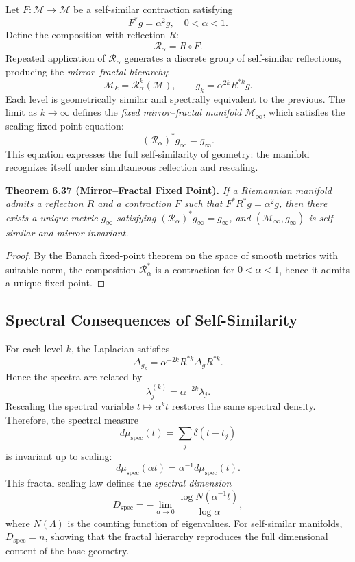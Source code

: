 Let \(F:\mathcal{M}\to\mathcal{M}\) be a self-similar contraction
satisfying
\[
F^{*}g = \alpha^{2} g, \quad 0<\alpha<1.
\]
Define the composition with reflection \(R\):
\[
\mathcal{R}_{\alpha} = R \circ F.
\]
Repeated application of \(\mathcal{R}_{\alpha}\)
generates a discrete group of self-similar reflections,
producing the \emph{mirror–fractal hierarchy}:
\[
\mathcal{M}_{k}
=\mathcal{R}_{\alpha}^{k}(\mathcal{M}),
\qquad
g_{k}=\alpha^{2k}R^{*k}g.
\]
Each level is geometrically similar and spectrally equivalent to the previous.
The limit as \(k\to\infty\) defines the
\emph{fixed mirror–fractal manifold}
\(\mathcal{M}_{\infty}\),
which satisfies the scaling fixed-point equation:
\[
(\mathcal{R}_{\alpha})^{*}g_{\infty}=g_{\infty}.
\]
This equation expresses the full self-similarity of geometry:
the manifold recognizes itself under simultaneous reflection and rescaling.

\noindent
\textbf{Theorem 6.37 (Mirror–Fractal Fixed Point).}
\emph{If a Riemannian manifold admits a reflection \(R\)
and a contraction \(F\) such that
\(F^{*}R^{*}g=\alpha^{2}g\),
then there exists a unique metric \(g_{\infty}\)
satisfying \((\mathcal{R}_{\alpha})^{*}g_{\infty}=g_{\infty}\),
and \((\mathcal{M}_{\infty},g_{\infty})\) is self-similar and mirror invariant.}

\begin{proof}
By the Banach fixed-point theorem
on the space of smooth metrics with suitable norm,
the composition \(\mathcal{R}_{\alpha}^{*}\)
is a contraction for \(0<\alpha<1\),
hence it admits a unique fixed point.
\end{proof}

\subsection{Spectral Consequences of Self-Similarity}\relax \hspace{0pt}

For each level \(k\),
the Laplacian satisfies
\[
\Delta_{g_{k}} = \alpha^{-2k} R^{*k} \Delta_{g} R^{*k}.
\]
Hence the spectra are related by
\[
\lambda_{j}^{(k)} = \alpha^{-2k}\lambda_{j}.
\]
Rescaling the spectral variable \(t \mapsto \alpha^{k} t\)
restores the same spectral density.
Therefore, the spectral measure
\[
d\mu_{\mathrm{spec}}(t)
=\sum_{j}\delta(t-t_{j})
\]
is invariant up to scaling:
\[
d\mu_{\mathrm{spec}}(\alpha t)=\alpha^{-1}d\mu_{\mathrm{spec}}(t).
\]
This fractal scaling law defines the \emph{spectral dimension}
\[
D_{\mathrm{spec}}
=-\lim_{\alpha\to 0}
\frac{\log N(\alpha^{-1}t)}{\log \alpha},
\]
where \(N(\Lambda)\) is the counting function of eigenvalues.
For self-similar manifolds,
\(D_{\mathrm{spec}}=n\),
showing that the fractal hierarchy reproduces the full dimensional content of the base geometry.

